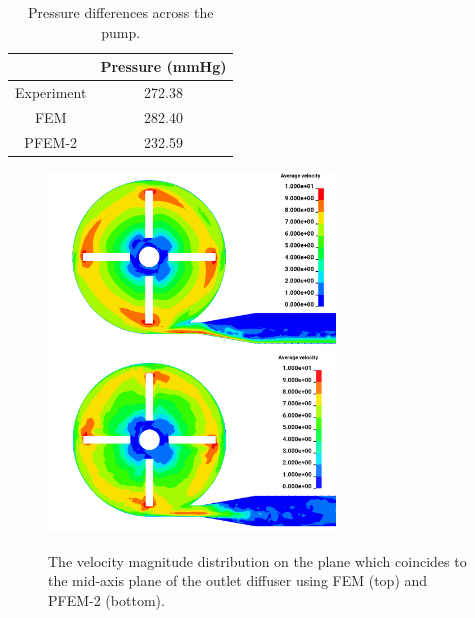 \begin{table}[h]
\caption {Pressure differences across the pump.}\label{tab:pumppres} 
\centering
\begin{tabular}{|c|c|}
\hline
 & Pressure (mmHg) \\ \hline
Experiment \cite{mali_cfd}    & 272.38    \\ \hline
FEM    & 282.40             \\ \hline
PFEM-2    & 232.59          \\ \hline
\end{tabular}
\end{table}

\begin{figure}[htbp]
    \centering
    \includegraphics[width=3in]{imgs/nozzle_pump/pumpvel_fem.png}\\
    \vspace{.5cm}
    \includegraphics[width=3in]{imgs/nozzle_pump/pumpvel_pfem.png}
    \caption{The velocity magnitude distribution on the plane which coincides to the mid-axis plane of the outlet diffuser using FEM (top) and PFEM-2 (bottom).}
    \label{fig:pumpvel}
\end{figure}


